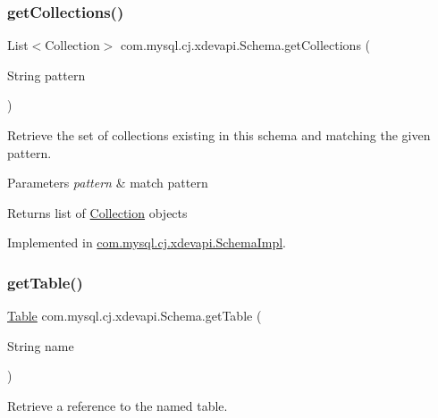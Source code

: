 \subsubsection{\texorpdfstring{get\+Collections()}{getCollections()}\hspace{0.1cm}{\footnotesize\ttfamily [2/2]}}
{\footnotesize\ttfamily List$<$Collection$>$ com.\+mysql.\+cj.\+xdevapi.\+Schema.\+get\+Collections (\begin{DoxyParamCaption}\item[{String}]{pattern }\end{DoxyParamCaption})}

Retrieve the set of collections existing in this schema and matching the given pattern.


\begin{DoxyParams}{Parameters}
{\em pattern} & match pattern \\
\hline
\end{DoxyParams}
\begin{DoxyReturn}{Returns}
list of \mbox{\hyperlink{interfacecom_1_1mysql_1_1cj_1_1xdevapi_1_1_collection}{Collection}} objects 
\end{DoxyReturn}


Implemented in \mbox{\hyperlink{classcom_1_1mysql_1_1cj_1_1xdevapi_1_1_schema_impl_a9a4dc1d12f1d8240c4b6bc114565b191}{com.\+mysql.\+cj.\+xdevapi.\+Schema\+Impl}}.

\mbox{\label{interfacecom_1_1mysql_1_1cj_1_1xdevapi_1_1_schema_a27cf7ad5981483a0e44b6ea795b3e428}} 
\subsubsection{\texorpdfstring{get\+Table()}{getTable()}\hspace{0.1cm}{\footnotesize\ttfamily [1/2]}}
{\footnotesize\ttfamily \mbox{\hyperlink{interfacecom_1_1mysql_1_1cj_1_1xdevapi_1_1_table}{Table}} com.\+mysql.\+cj.\+xdevapi.\+Schema.\+get\+Table (\begin{DoxyParamCaption}\item[{String}]{name }\end{DoxyParamCaption})}

Retrieve a reference to the named table.


